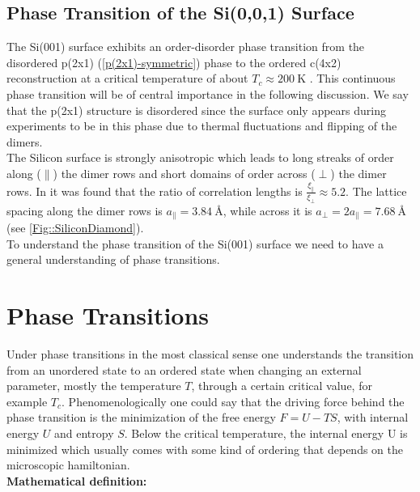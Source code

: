 	\section{Phase Transition of the Si(0,0,1) Surface}
	The Si(001) surface exhibits an order-disorder phase transition from the disordered p(2x1) (\autoref{p(2x1)-symmetric}) phase to the ordered c(4x2) reconstruction at a critical temperature of about $T_c \approx 200~\text{K}$ \cite{tabata1987order}. This continuous phase transition will be of central importance in the following discussion. We say that the p(2x1) structure is disordered since the surface only appears during experiments to be in this phase due to thermal fluctuations and flipping of the dimers. \\
	
	The Silicon surface is strongly anisotropic which leads to long streaks of order along ($\parallel$) the dimer rows and short domains of order across ($\perp$) the dimer rows. In \cite{brand2023dimer} it was found that the ratio of correlation lengths is $\frac{\xi_{\parallel}}{\xi_{\perp}} \approx 5.2$. The lattice spacing along the dimer rows is $a_\parallel =	3.84~\text{\AA}$, while across it is $a_\perp =	2 a_\parallel =	7.68~\text{\AA}$ (see \autoref{Fig::SiliconDiamond}). \\
	
	To understand the phase transition of the Si(001) surface we need to have a general understanding of phase transitions.
	\chapter{Phase Transitions}
	Under phase transitions in the most classical sense one understands the transition from an unordered state to an ordered state when changing an external parameter, mostly the temperature $T$, through a certain critical value, for example $T_c$. Phenomenologically one could say that the driving force behind the phase transition is the minimization of the free energy $F = U - TS $, with internal energy $U$ and entropy $S$. Below the critical temperature, the internal energy U is minimized which usually comes with some kind of ordering that depends on the microscopic hamiltonian.
	\newline
	\\
	\textbf{Mathematical definition:}
	
